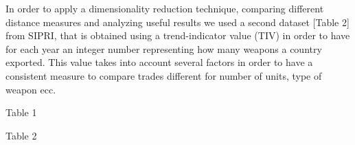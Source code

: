 \documentclass[twocolumn]{article}
\begin{document}
In order to apply a dimensionality reduction technique, comparing different distance measures and analyzing useful results we used a second dataset [Table 2] from SIPRI, that is obtained using a trend-indicator value (TIV) in order to have for each year an integer number representing how many weapons a country exported. This value takes into account several factors in order to have a consistent measure to compare trades different for number of units, type of weapon ecc.

\onecolumn
\begin{center}

\begin{table}[hbt!]
\end{table}
\label{tab1}Table 1

\end{center}

\begin{center}
\begin{table}[hbt!]
\end{table}
\label{Table 2} Table 2
\end{center}
\twocolumn
\end{document}
